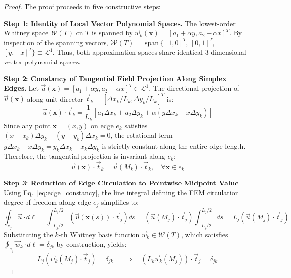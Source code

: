 \documentclass[preprint,12pt]{elsarticle}
\begin{document}
\begin{proof}
The proof proceeds in five constructive steps:

\textbf{Step 1: Identity of Local Vector Polynomial Spaces.} 
The lowest-order Whitney space $\mathcal{W}(T)$ on $T$ is spanned by $\vec{w}_k(\mathbf{x}) = [a_1 + \alpha y, a_2 - \alpha x]^T$. By inspection of the spanning vectors, $\mathcal{W}(T) = \operatorname{span}\{[1,0]^T$, $[0,1]^T$, $[y,-x]^T\} \equiv \mathcal{L}^1$. Thus, both approximation spaces share identical 3-dimensional vector polynomial spaces.

\textbf{Step 2: Constancy of Tangential Field Projection Along Simplex Edges.} 
Let $\vec{u}(\mathbf{x}) = [a_1 + \alpha y, a_2 - \alpha x]^T \in \mathcal{L}^1$. The directional projection of $\vec{u}(\mathbf{x})$ along unit director $\vec{t}_k = [\Delta x_k / L_k, \Delta y_k / L_k]^T$ is:
\begin{equation}
\vec{u}(\mathbf{x}) \cdot \vec{t}_k = \frac{1}{L_k} \left[ a_1 \Delta x_k + a_2 \Delta y_k + \alpha (y \Delta x_k - x \Delta y_k) \right]
\end{equation}
Since any point $\mathbf{x} = (x,y)$ on edge $e_k$ satisfies $(x - x_k)\Delta y_k - (y - y_k)\Delta x_k = 0$, the rotational term $y \Delta x_k - x \Delta y_k = y_k \Delta x_k - x_k \Delta y_k$ is strictly constant along the entire edge length. Therefore, the tangential projection is invariant along $e_k$:
\begin{equation}
\vec{u}(\mathbf{x}) \cdot \vec{t}_k = \vec{u}(M_k) \cdot \vec{t}_k, \quad \forall \mathbf{x} \in e_k
\label{eq:edge_constancy}
\end{equation}

\textbf{Step 3: Reduction of Edge Circulation to Pointwise Midpoint Value.} 
Using Eq.~\eqref{eq:edge_constancy}, the line integral defining the FEM circulation degree of freedom along edge $e_j$ simplifies to:
\begin{equation}
\oint_{e_j} \vec{u} \cdot d\boldsymbol{\ell} = \int_{-L_j/2}^{L_j/2} \left( \vec{u}(\mathbf{x}(s)) \cdot \vec{t}_j \right) ds = \left( \vec{u}(M_j) \cdot \vec{t}_j \right) \int_{-L_j/2}^{L_j/2} ds = L_j \left( \vec{u}(M_j) \cdot \vec{t}_j \right)
\end{equation}
Substituting the $k$-th Whitney basis function $\vec{w}_k \in \mathcal{W}(T)$, which satisfies $\oint_{e_j} \vec{w}_k \cdot d\boldsymbol{\ell} = \delta_{jk}$ by construction, yields:
\begin{equation}
L_j \left( \vec{w}_k(M_j) \cdot \vec{t}_j \right) = \delta_{jk} \quad \implies \quad \left( L_k \vec{w}_k(M_j) \right) \cdot \vec{t}_j = \delta_{jk}
\label{eq:whitney_midpoint_proj}
\end{equation}


\end{proof}
\end{document}

